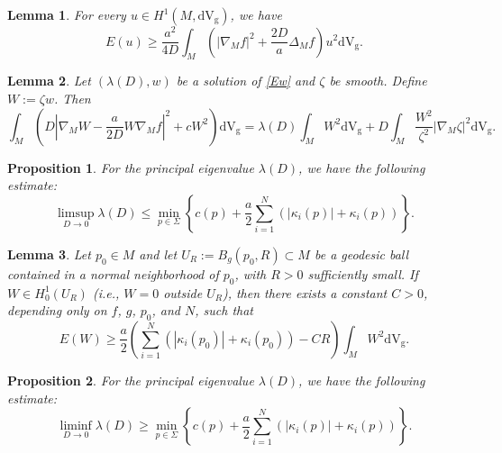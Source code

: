 \documentclass[10pt,a4paper]{amsart}
\newtheorem{lemma}{Lemma}
\newtheorem{proposition}{Proposition}
\newcommand{\V}{\mathrm{d} \mathrm{V_g}}
\begin{document}
\begin{lemma}\label{lem:2.1}
For every \(u\in H^1(M,\V)\), we have 
\[
E(u)\ge \frac{a^2}{4D}  \int_{M} \left( | \nabla_M f|^2 +
     \frac{2D}{a} \Delta_M f \right) u^2 \V.
\]
\end{lemma}

\begin{lemma}\label{lem:2.2}
Let \((\lambda(D), w)\) be a solution of \eqref{Ew} and \(\zeta\) be smooth. Define \(W := \zeta w\). Then
\begin{equation}
\int_M \left( D \left| \nabla_M W - \frac{a}{2D} W \nabla_M f \right|^2 + c W^2 \right) \V =\! \lambda(D) \int_M W^2 \V + D \int_M \frac{W^2}{\zeta^2} |\nabla_M \zeta|^2 \V.
\end{equation}
\end{lemma}

\begin{proposition}\label{prop:upper} 
For the principal eigenvalue $\lambda(D)$, we have the following estimate:
\[
\limsup_{D \to 0} \lambda(D) \leq \min_{p \in \Sigma} \left\{ c(p) + \frac{a}{2} \sum_{i=1}^N \left( |\kappa_i(p)| + \kappa_i(p) \right) \right\}.
\]
\end{proposition}

\begin{lemma}\label{lem:2.3}
Let \(p_0 \in M\) and let \(U_R:=B_g(p_0,R)\subset M\) be a geodesic ball contained in a normal neighborhood of \(p_0\), with \(R>0\) sufficiently small. If \(W\in H_0^1(U_R)\) (i.e.,  $W=0$ outside $U_R$), then there exists a constant \(C>0\), depending only on \(f\), \(g\), \(p_0\), and \(N\), such that
\begin{equation}\label{I:llb}
E(W) \geq \frac{a}{2} \left( \sum_{i=1}^N \left( |\kappa_i(p_0)| + \kappa_i(p_0) \right) - C R \right) \int_M W^2 \V.
\end{equation}
\end{lemma}

\begin{proposition}\label{prop:lower} 
For the principal eigenvalue $\lambda(D)$, we have the following estimate:
\[
\liminf_{D \to 0} \lambda(D) \geq \min_{p \in \Sigma} \left\{ c(p) + \frac{a}{2} \sum_{i=1}^N \left( |\kappa_i(p)| + \kappa_i(p) \right) \right\}.
\]
\end{proposition}
\end{document}
